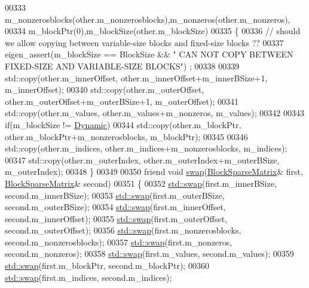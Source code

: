 \begin{DoxyCode}
00333         m\_nonzerosblocks(other.m\_nonzerosblocks),m\_nonzeros(other.m\_nonzeros),
00334         m\_blockPtr(0),m\_blockSize(other.m\_blockSize)
00335     \{
00336       \textcolor{comment}{// should we allow copying between variable-size blocks and fixed-size blocks ??}
00337       eigen\_assert(m\_blockSize == BlockSize && \textcolor{stringliteral}{" CAN NOT COPY BETWEEN FIXED-SIZE AND VARIABLE-SIZE BLOCKS"})
      ;
00338 
00339       std::copy(other.m\_innerOffset, other.m\_innerOffset+m\_innerBSize+1, m\_innerOffset);
00340       std::copy(other.m\_outerOffset, other.m\_outerOffset+m\_outerBSize+1, m\_outerOffset);
00341       std::copy(other.m\_values, other.m\_values+m\_nonzeros, m\_values);
00342 
00343       \textcolor{keywordflow}{if}(m\_blockSize != \hyperlink{namespace_eigen_ad81fa7195215a0ce30017dfac309f0b2}{Dynamic})
00344         std::copy(other.m\_blockPtr, other.m\_blockPtr+m\_nonzerosblocks, m\_blockPtr);
00345 
00346       std::copy(other.m\_indices, other.m\_indices+m\_nonzerosblocks, m\_indices);
00347       std::copy(other.m\_outerIndex, other.m\_outerIndex+m\_outerBSize, m\_outerIndex);
00348     \}
00349 
00350     \textcolor{keyword}{friend} \textcolor{keywordtype}{void} \hyperlink{endian_8c_a3ca5ecd34b04d6a243c054ac3a57f68d}{swap}(\hyperlink{group___sparse_core___module_class_eigen_1_1_block_sparse_matrix}{BlockSparseMatrix}& first, 
      \hyperlink{group___sparse_core___module_class_eigen_1_1_block_sparse_matrix}{BlockSparseMatrix}& second)
00351     \{
00352       \hyperlink{endian_8c_a3ca5ecd34b04d6a243c054ac3a57f68d}{std::swap}(first.m\_innerBSize, second.m\_innerBSize);
00353       \hyperlink{endian_8c_a3ca5ecd34b04d6a243c054ac3a57f68d}{std::swap}(first.m\_outerBSize, second.m\_outerBSize);
00354       \hyperlink{endian_8c_a3ca5ecd34b04d6a243c054ac3a57f68d}{std::swap}(first.m\_innerOffset, second.m\_innerOffset);
00355       \hyperlink{endian_8c_a3ca5ecd34b04d6a243c054ac3a57f68d}{std::swap}(first.m\_outerOffset, second.m\_outerOffset);
00356       \hyperlink{endian_8c_a3ca5ecd34b04d6a243c054ac3a57f68d}{std::swap}(first.m\_nonzerosblocks, second.m\_nonzerosblocks);
00357       \hyperlink{endian_8c_a3ca5ecd34b04d6a243c054ac3a57f68d}{std::swap}(first.m\_nonzeros, second.m\_nonzeros);
00358       \hyperlink{endian_8c_a3ca5ecd34b04d6a243c054ac3a57f68d}{std::swap}(first.m\_values, second.m\_values);
00359       \hyperlink{endian_8c_a3ca5ecd34b04d6a243c054ac3a57f68d}{std::swap}(first.m\_blockPtr, second.m\_blockPtr);
00360       \hyperlink{endian_8c_a3ca5ecd34b04d6a243c054ac3a57f68d}{std::swap}(first.m\_indices, second.m\_indices);

\end{DoxyCode}
